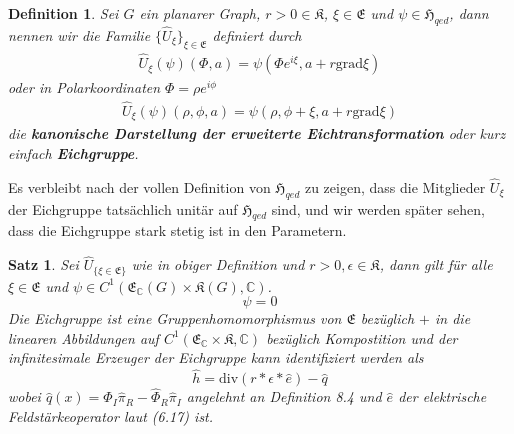 \documentclass[11pt,a4paper,leqno]{report}
\newtheorem{proposition}{Satz}[chapter]
\newtheorem{definition}[theorem]{Definition}
\numberwithin{equation}{chapter}
\begin{document}
\begin{definition}
	Sei $G$ ein planarer Graph, $r>0\in\mathfrak{K}$, $\xi\in \mathfrak{E}$ und $\psi\in\mathfrak{H}_{qed}$,  dann nennen wir die Familie $\{\hat{U}_\xi\}_{\xi\in \mathfrak{E}}$ definiert durch
	\begin{align}
		\hat{U}_\xi(\psi)(\Phi, a) =  \psi(\Phi e^{i\xi}, a + r \text{grad}\xi)
	\end{align}
    oder in Polarkoordinaten $\Phi = \rho e^{i\phi}$
    \begin{align}
    	\hat{U}_\xi(\psi)(\rho, \phi, a)=  \psi(\rho, \phi + \xi, a + r \text{grad}\xi)
    \end{align}
	die \textbf{kanonische Darstellung der erweiterte Eichtransformation} oder kurz einfach \textbf{Eichgruppe}.
\end{definition}
\noindent
Es verbleibt nach der vollen Definition von $\mathfrak{H}_{qed}$ zu zeigen, dass die Mitglieder $\hat{U}_\xi$ der Eichgruppe tats\"achlich unit\"ar auf $\mathfrak{H}_{qed}$ sind, und wir werden sp\"ater sehen, dass die Eichgruppe stark stetig ist in den Parametern.
\begin{proposition}
	Sei $\hat{U}_{\{\xi\in \mathfrak{E}\}}$ wie in obiger Definition und $r>0,\epsilon\in\mathfrak{K}$, dann gilt f\"ur alle $\xi\in \mathfrak{E}$ und $\psi\in C^1(\mathfrak{E}_\mathbb{C}(G)\times\mathfrak{K}(G), \mathbb{C})$.
	\begin{equation}
		[\hat{H}_{qed}, \hat{U}_\xi]\psi=0
	\end{equation}
	Die Eichgruppe ist eine Gruppenhomomorphismus von $\mathfrak{E}$ bez\"uglich $+$ in die linearen Abbildungen auf $C^1(\mathfrak{E}_\mathbb{C}\times\mathfrak{K},\mathbb{C})$ bez\"uglich Kompostition
	und der infinitesimale Erzeuger der Eichgruppe kann identifiziert werden als
	\begin{equation}
		\hat{h} =  \text{div}(r*\epsilon*\hat{e})-\hat{q}
	\end{equation}
	wobei $\hat{q}(x)=\hat{\Phi}_I\hat{\pi}_R-\hat{\Phi}_R\hat{\pi}_I$ angelehnt an Definition 8.4 und $\hat{e}$ der elektrische Feldst\"arkeoperator laut (6.17) ist. 
\end{proposition}
\end{document}
